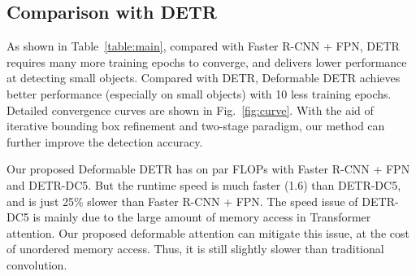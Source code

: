 \documentclass{article}
\begin{document}
\subsection{Comparison with DETR}

As shown in Table~\ref{table:main}, compared with Faster R-CNN + FPN, DETR requires many more training epochs to converge, and delivers lower performance at detecting small objects. Compared with DETR, Deformable DETR achieves better performance (especially on small objects) with 10 less training epochs. Detailed convergence curves are shown in Fig.~\ref{fig:curve}. With the aid of iterative bounding box refinement and two-stage paradigm, our method can further improve the detection accuracy.

Our proposed Deformable DETR has on par FLOPs with Faster R-CNN + FPN and DETR-DC5. But the runtime speed is much faster (1.6) than DETR-DC5, and is just 25\% slower than Faster R-CNN + FPN. The speed issue of DETR-DC5 is mainly due to the large amount of memory access in Transformer attention. Our proposed deformable attention can mitigate this issue, at the cost of unordered memory access. Thus, it is still slightly slower than traditional convolution. 
\end{document}
